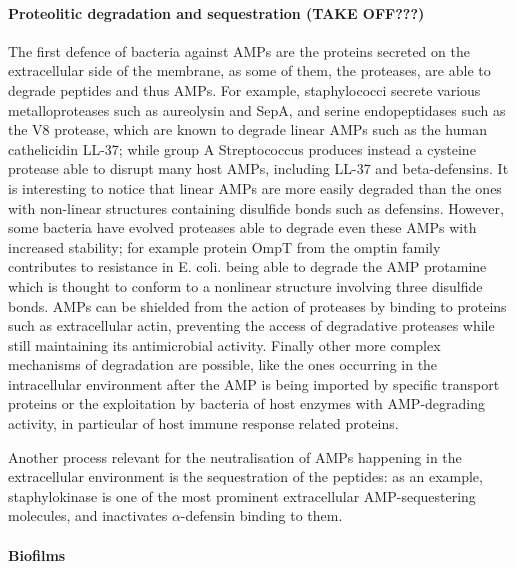 \documentclass[a4paper,11pt]{extreport}
\begin{document}
\paragraph{Proteolitic degradation and sequestration (TAKE OFF???)}
The first defence of bacteria against AMPs are the proteins secreted on the extracellular side of the membrane, as some of them, the proteases, are able to degrade peptides and thus AMPs.
%
For example, staphylococci secrete various metalloproteases such as aureolysin and SepA, and serine endopeptidases such as the V8 protease, which are known to degrade linear AMPs such as the human cathelicidin LL-37;\cite{Sieprawska-Lupa2004,Teufel1993} while group A Streptococcus produces instead a cysteine protease able to disrupt many host AMPs, including LL-37 and beta-defensins.\cite{Schmidtchen2002,Baranska-Rybak2006,Nelson2011,Frick2011} It is interesting to notice that linear AMPs are more easily degraded than the ones with non-linear structures containing disulfide bonds\cite{Peschel2006} such as defensins.\cite{Selsted1989}
However, some bacteria have evolved proteases able to  degrade even these AMPs with increased stability; for example protein OmpT from the omptin family contributes to resistance in E. coli. being able to degrade the AMP protamine \cite{Stumpe1998}
which is thought to conform to a nonlinear structure involving three disulfide bonds.\cite{Biegeleisen2006} 
AMPs can be shielded from the action of proteases by binding to proteins such as extracellular actin, preventing the access of degradative proteases while  still maintaining its antimicrobial activity.\cite{Sol2014}
Finally other more complex mechanisms of degradation are possible, like the ones occurring in the intracellular environment after the AMP is being imported by specific transport proteins\cite{Groisman1992,Parra-Lopez1993,Mason2005} or the exploitation by bacteria of host enzymes with AMP-degrading activity, in particular  of host immune response related proteins.\cite{Taggart2003}

Another process relevant for the neutralisation of AMPs happening in the extracellular environment is the sequestration of the peptides: as an example, staphylokinase is one of the most prominent extracellular AMP-sequestering molecules,\cite{Bokarewa2004,Jin2004} and inactivates $\alpha$-defensin binding to them.


\paragraph{Biofilms}
\end{document}
